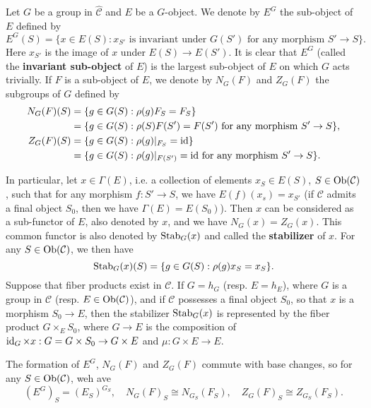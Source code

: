 \begin{definition}
Let $G$ be a group in $\widehat{\mathcal{C}}$ and $E$ be a $G$-object. We denote by $E^G$ the sub-object of $E$ defined by
\[E^G(S)=\{x\in E(S):\text{$x_{S'}$ is invariant under $G(S')$ for any morphism $S'\to S$}\}.\]
Here $x_{S'}$ is the image of $x$ under $E(S)\to E(S')$. It is clear that $E^G$ (called the \textbf{invariant sub-object} of $E$) is the largest sub-object of $E$ on which $G$ acts trivially. If $F$ is a sub-object of $E$, we denote by $N_G(F)$ and $Z_G(F)$ the subgroups of $G$ defined by
\begin{align*}
N_G(F)(S)&=\{g\in G(S):\rho(g)F_S=F_S\}\\
&=\{g\in G(S):\text{$\rho(S)F(S')=F(S')$ for any morphism $S'\to S$}\},\\
Z_G(F)(S)&=\{g\in G(S):\rho(g)|_{F_S}=\operatorname{id}\}\\
&=\{g\in G(S):\text{$\rho(g)|_{F(S')}=\operatorname{id}$ for any morphism $S'\to S$}\}.
\end{align*}
\end{definition}
In particular, let $x\in\Gamma(E)$, i.e. a collection of elements $x_S\in E(S)$, $S\in\mathrm{Ob}(\mathcal{C})$, such that for any morphism $f:S'\to S$, we have $E(f)(x_s)=x_{S'}$ (if $\mathcal{C}$ admits a final object $S_0$, then we have $\Gamma(E)=E(S_0)$). Then $x$ can be considered as a sub-functor of $E$, also denoted by $x$, and we have $N_G(x)=Z_G(x)$. This common functor is also denoted by $\mathrm{Stab}_G(x)$ and called the \textbf{stabilizer} of $x$. For any $S\in\mathrm{Ob}(\mathcal{C})$, we then have
\[\mathrm{Stab}_G(x)(S)=\{g\in G(S):\rho(g)x_S=x_S\}.\]
Suppose that fiber products exist in $\mathcal{C}$. If $G=h_G$ (resp. $E=h_E$), where $G$ is a group in $\mathcal{C}$ (resp. $E\in\mathrm{Ob}(\mathcal{C})$), and if $\mathcal{C}$ possesses a final object $S_0$, so that $x$ is a morphism $S_0\to E$, then the stabilizer $\mathrm{Stab}_G(x)$ is represented by the fiber product $G\times_ES_0$, where $G\to E$ is the composition of $\operatorname{id}_G\times x:G=G\times S_0\to G\times E$ and $\mu:G\times E\to E$.

\begin{remark}
The formation of $E^G$, $N_G(F)$ and $Z_G(F)$ commute with base changes, so for any $S\in\mathrm{Ob}(\mathcal{C})$, weh ave
\[(E^G)_S=(E_S)^{G_S},\quad N_G(F)_S\cong N_{G_S}(F_S),\quad Z_G(F)_S\cong Z_{G_S}(F_S).\]
\end{remark}

